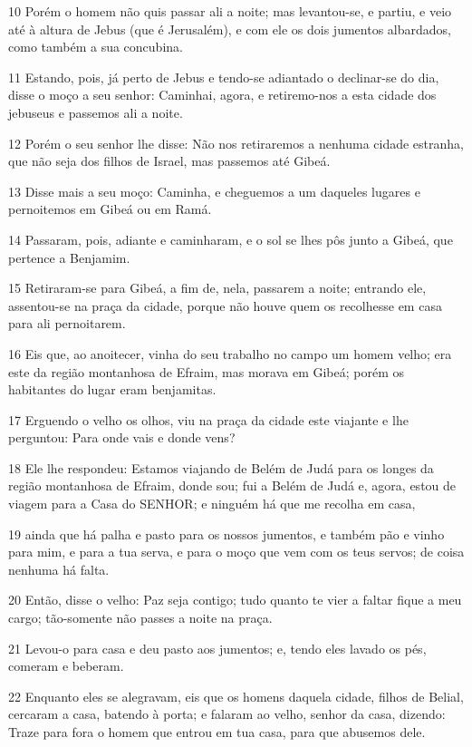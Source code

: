 \par 10 Porém o homem não quis passar ali a noite; mas levantou-se, e partiu, e veio até à altura de Jebus (que é Jerusalém), e com ele os dois jumentos albardados, como também a sua concubina.
\par 11 Estando, pois, já perto de Jebus e tendo-se adiantado o declinar-se do dia, disse o moço a seu senhor: Caminhai, agora, e retiremo-nos a esta cidade dos jebuseus e passemos ali a noite.
\par 12 Porém o seu senhor lhe disse: Não nos retiraremos a nenhuma cidade estranha, que não seja dos filhos de Israel, mas passemos até Gibeá.
\par 13 Disse mais a seu moço: Caminha, e cheguemos a um daqueles lugares e pernoitemos em Gibeá ou em Ramá.
\par 14 Passaram, pois, adiante e caminharam, e o sol se lhes pôs junto a Gibeá, que pertence a Benjamim.
\par 15 Retiraram-se para Gibeá, a fim de, nela, passarem a noite; entrando ele, assentou-se na praça da cidade, porque não houve quem os recolhesse em casa para ali pernoitarem.
\par 16 Eis que, ao anoitecer, vinha do seu trabalho no campo um homem velho; era este da região montanhosa de Efraim, mas morava em Gibeá; porém os habitantes do lugar eram benjamitas.
\par 17 Erguendo o velho os olhos, viu na praça da cidade este viajante e lhe perguntou: Para onde vais e donde vens?
\par 18 Ele lhe respondeu: Estamos viajando de Belém de Judá para os longes da região montanhosa de Efraim, donde sou; fui a Belém de Judá e, agora, estou de viagem para a Casa do SENHOR; e ninguém há que me recolha em casa,
\par 19 ainda que há palha e pasto para os nossos jumentos, e também pão e vinho para mim, e para a tua serva, e para o moço que vem com os teus servos; de coisa nenhuma há falta.
\par 20 Então, disse o velho: Paz seja contigo; tudo quanto te vier a faltar fique a meu cargo; tão-somente não passes a noite na praça.
\par 21 Levou-o para casa e deu pasto aos jumentos; e, tendo eles lavado os pés, comeram e beberam.
\par 22 Enquanto eles se alegravam, eis que os homens daquela cidade, filhos de Belial, cercaram a casa, batendo à porta; e falaram ao velho, senhor da casa, dizendo: Traze para fora o homem que entrou em tua casa, para que abusemos dele.
